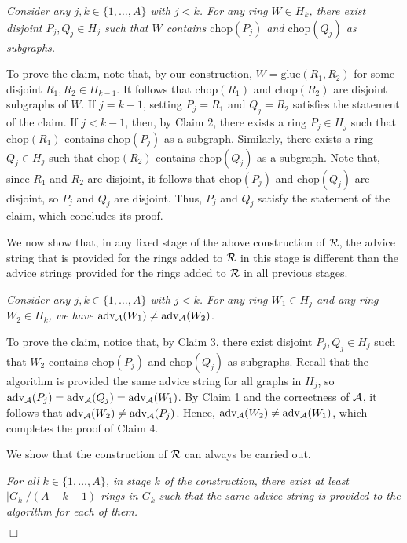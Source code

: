 \documentclass[11pt]{article}
\newcommand{\qed}{\hfill $\Box$ \bigbreak}
\newenvironment{proof}{\noindent {\bf Proof.}}{\qed}
\newcommand{\algname}{\ensuremath{{\cal A}}}
\newcommand{\chop}[1]{\ensuremath{\mathrm{chop}(#1)}}
\newcommand{\advice}[1]{\ensuremath{\mathrm{adv}_{\algname}(#1)}}
\newcommand{\glue}[2]{\ensuremath{\mathrm{glue}(#1,#2)}}
\begin{document}
\begin{proof}
\vspace{3mm} 
\textit{Consider any $j,k \in \{1,\ldots,A\}$ with $j < k$. For any ring $W \in H_k$, there exist disjoint $P_j,Q_j \in H_j$ such that $W$ contains $\chop{P_j}$ and $\chop{Q_j}$ as subgraphs.}
\vspace{3mm}

To prove the claim, note that, by our construction,  $W = \glue{R_1}{R_2}$ for some disjoint $R_1,R_2 \in H_{k-1}$. It follows that $\chop{R_1}$ and $\chop{R_2}$ are disjoint subgraphs of $W$. If $j=k-1$, setting $P_j = R_1$ and $Q_j = R_2$ satisfies the statement of the claim. If $j < k-1$, then, by Claim 2, there exists a ring $P_j \in H_j$ such that $\chop{R_1}$ contains $\chop{P_j}$ as a subgraph. Similarly, there exists a ring $Q_j \in H_j$ such that $\chop{R_2}$ contains $\chop{Q_j}$ as a subgraph. Note that, since $R_1$ and $R_2$ are disjoint, it follows that $\chop{P_j}$ and $\chop{Q_j}$ are disjoint, so $P_j$ and $Q_j$ are disjoint. Thus, $P_j$ and $Q_j$ satisfy the statement of the claim, which concludes its proof.

We now show that, in any fixed stage of the above construction of ${\cal R}$, the advice string that is provided for the rings added to ${\cal R}$ in this stage is different than the advice strings provided for the rings added to ${\cal R}$ in all previous stages.

\vspace{3mm} 
\textit{Consider any $j,k \in \{1,\ldots,A\}$ with $j < k$. For any ring $W_1 \in H_j$ and any ring $W_2 \in H_k$, we have $\advice{W_1} \neq \advice{W_2}$.}
\vspace{3mm}

To prove the claim, notice that, by Claim 3, there exist disjoint $P_j,Q_j \in H_j$ such that $W_2$ contains $\chop{P_j}$ and $\chop{Q_j}$ as subgraphs. Recall that the algorithm is provided the same advice string for all graphs in $H_{j}$, so $\advice{P_j} = \advice{Q_j} = \advice{W_1}$. By Claim 1 and the correctness of $\cal A$, it follows that $\advice{W_2} \neq \advice{P_j}$. Hence, $\advice{W_2} \neq \advice{W_1}$, which completes the proof of Claim 4.


We show that the construction of ${\cal R}$ can always be carried out. 

\vspace{3mm} 
\textit{For all $k \in \{1,\ldots,A\}$, in stage $k$ of the construction, there exist at least $|G_k|/(A-k+1)$ rings in $G_k$ such that the same advice string is provided to the algorithm for each of them.}
\vspace{3mm}


\end{proof}
\end{document}
